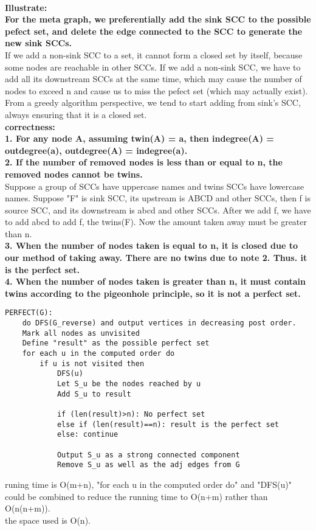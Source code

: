 \documentclass[12pt,a4paper]{article}
\newcommand{\question}[1]{\bigskip\noindent{\textbf{Q{#1} solution}}}
\begin{document}
\question{30}\\
\textbf{Illustrate:}\\
\textbf{For the meta graph, we preferentially add the sink SCC to the possible pefect set, and delete the edge connected to the SCC to generate the new sink SCCs.}\\
If we add a non-sink SCC to a set, it cannot form a closed set by itself, because some nodes are reachable in other SCCs. If we add a non-sink SCC, we have to add all its downstream SCCs at the same time, which may cause the number of nodes to exceed n and cause us to miss the pefect set (which may actually exist). From a greedy algorithm perspective, we tend to start adding from sink's SCC, always ensuring that it is a closed set.\\
\textbf{correctness:}\\
\textbf{1. For any node A, assuming twin(A) = a, then indegree(A) = outdegree(a), outdegree(A) = indegree(a).}\\
\textbf{2. If the number of removed nodes is less than or equal to n, the removed nodes cannot be twins.}\\
Suppose a group of SCCs have uppercase names and twins SCCs have lowercase names. Suppose "F" is sink SCC, its upstream is ABCD and other SCCs, then f is source SCC, and its downstream is abcd and other SCCs. After we add f, we have to add abcd to add f, the twins(F). Now the amount taken away must be greater than n.\\
\textbf{3. When the number of nodes taken is equal to n, it is closed due to our method of taking away. There are no twins due to note 2. Thus. it is the perfect set.}\\
\textbf{4. When the number of nodes taken is greater than n, it must contain twins according to the pigeonhole principle, so it is not a perfect set.}\\
\begin{lstlisting}
PERFECT(G):
	do DFS(G_reverse) and output vertices in decreasing post order.
	Mark all nodes as unvisited
	Define "result" as the possible perfect set
	for each u in the computed order do
		if u is not visited then
			DFS(u)
			Let S_u be the nodes reached by u
			Add S_u to result 
	
			if (len(result)>n): No perfect set
			else if (len(result)==n): result is the perfect set
			else: continue
	
			Output S_u as a strong connected component
			Remove S_u as well as the adj edges from G
\end{lstlisting}
runing time is O(m+n), "for each u in the computed order do" and "DFS(u)" could be combined to reduce the running time to O(n+m) rather than O(n(n+m)).\\
the space used is O(n).\\
\end{document}

